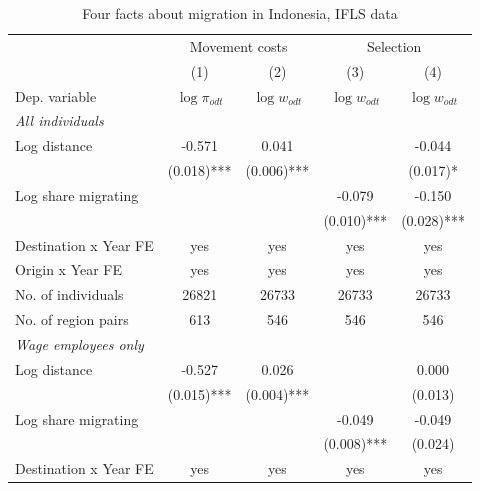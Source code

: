 \begin{table} \begin{small} \begin{center}\begin{threeparttable}[b] \caption{ {Four facts about migration in Indonesia, IFLS data     }} \label{Four facts about migration in Indonesia, IFLS data     } \begin{tabular}{l*{4}c} \toprule
                    &\multicolumn{2}{c}{Movement costs}&\multicolumn{2}{c}{Selection}  \\
                    &         (1)   &         (2)   &         (3)   &         (4)   \\
Dep. variable       &$\log \pi_{odt}$   &$\log w_{odt}$    &$\log w_{odt}$    &$\log w_{odt}$    \\
\midrule
\multicolumn{5}{l}{\emph{All individuals}} \\Log distance        &      -0.571   &       0.041   &               &      -0.044   \\
                    &     (0.018)***&     (0.006)***&               &     (0.017)*  \\
Log share migrating &               &               &      -0.079   &      -0.150   \\
                    &               &               &     (0.010)***&     (0.028)***\\\midrule
Destination x Year FE&         yes   &         yes   &         yes   &         yes   \\
Origin x Year FE    &         yes   &         yes   &         yes   &         yes   \\
No. of individuals  &       26821   &       26733   &       26733   &       26733   \\
No. of region pairs &         613   &         546   &         546   &         546   \\
\midrule \multicolumn{5}{l}{\emph{Wage employees only}} \\Log distance        &      -0.527   &       0.026   &               &       0.000   \\
                    &     (0.015)***&     (0.004)***&               &     (0.013)   \\
Log share migrating &               &               &      -0.049   &      -0.049   \\
                    &               &               &     (0.008)***&     (0.024)   \\\midrule
Destination x Year FE&         yes   &         yes   &         yes   &         yes   \\

\end{tabular}
\end{threeparttable}
\end{center}
\end{small}
\end{table}
